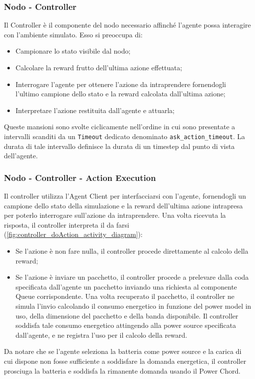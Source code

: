 \documentclass[conference]{IEEEtran}
\newcommand{\code}[1]{\texttt{#1}}
\begin{document}
\subsubsection{Nodo - Controller}
Il Controller è il componente del nodo necessario affinché l'agente possa interagire con
l'ambiente simulato. Esso si preoccupa di:
\begin{itemize}
    \item Campionare lo stato visibile dal nodo;
    \item Calcolare la reward frutto dell'ultima azione effettuata;
    \item Interrogare l'agente per ottenere l'azione da intraprendere fornendogli 
    l'ultimo campione dello stato e la reward calcolata dall'ultima azione;
    \item Interpretare l'azione restituita dall'agente e attuarla;
\end{itemize} 
Queste mansioni sono svolte ciclicamente nell'ordine in cui sono presentate
a intervalli scanditi da un \code{Timeout} dedicato denominato
\code{ask\_action\_timeout}. La durata di tale intervallo
definisce la durata di un timestep dal punto di vista dell'agente.

\subsubsection{Nodo - Controller - Action Execution}
Il controller utilizza l'Agent Client per interfacciarsi con l'agente, fornendogli un
campione dello stato della simulazione e la reward dell'ultima azione intrapresa per
poterlo interrogare sull'azione da intraprendere. Una volta ricevuta la risposta, il
controller interpreta il da farsi (\autoref{fig:controller_doAction_activity_diagram}):
\begin{itemize}
    \item Se l'azione è non fare nulla, il controller procede direttamente al calcolo
    della reward;
    \item Se l'azione è inviare un pacchetto, il controller procede a prelevare dalla
    coda specificata dall'agente un pacchetto inviando una richiesta al componente Queue
    corrispondente. Una volta recuperato il pacchetto, il controller ne simula l'invio
    calcolando il consumo energetico in funzione del power model in uso, della dimensione
    del pacchetto e della banda disponibile. Il controller soddisfa tale
    consumo energetico attingendo alla power source specificata dall'agente, e ne
    registra l'uso per il calcolo della reward.
\end{itemize}
Da notare che se l'agente seleziona la batteria come power source e la carica di cui
dispone non fosse sufficiente a soddisfare la domanda energetica, il controller prosciuga
la batteria e soddisfa la rimanente domanda usando il Power Chord.
\end{document}
